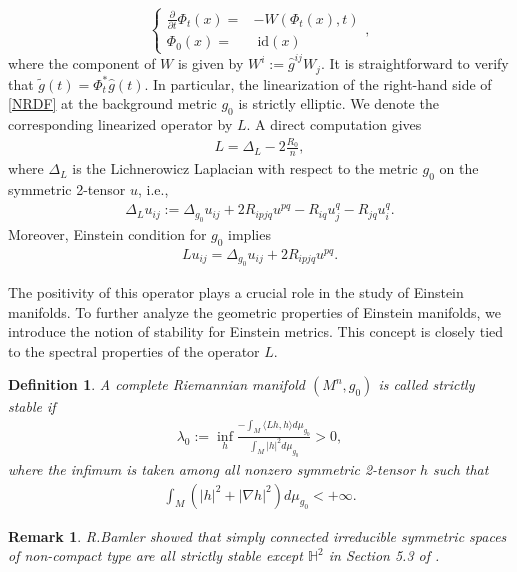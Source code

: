 \documentclass[12pt]{amsart}
\newtheorem{definition}{Definition}[section]
\newtheorem{remark}{Remark}[section]
\begin{document}
\begin{equation}\label{gauge term diffeomorphism}
    \left\{
        \begin{aligned}
            \frac{\partial}{\partial t} \Phi_t(x) =& -W(\Phi_t(x), t)\\
            \Phi_0(x) =& \; \mathrm{id}(x)
        \end{aligned}
    \right.,
\end{equation}
where the component of $W$ is given by $W^i := \hat{g}^{ij} W_j$. It is straightforward to verify that $\tilde{g}(t) = \Phi_{t}^{*}\hat{g}(t)$. In particular, the linearization of the right-hand side of \eqref{NRDF} at the background metric $g_0$ is strictly elliptic. We denote the corresponding linearized operator by $L$. A direct computation gives
\begin{align}
    L = \Delta_L - 2\frac{R_0}{n},
\end{align}
where $\Delta_L$ is the Lichnerowicz Laplacian with respect to the metric $g_0$ on the symmetric 2-tensor $u$, i.e., 
\begin{align}
    \Delta_L u_{ij} := \Delta_{g_0} u_{ij} + 2R_{ipjq} u^{pq} - R_{iq} u^{q}_j - R_{jq}u^{q}_{i}.
\end{align}
Moreover, Einstein condition for $g_0$ implies 
\begin{align}
    L u_{ij} = \Delta_{g_0} u_{ij} + 2 R_{ipjq} u^{pq}.
\end{align}

The positivity of this operator plays a crucial role in the study of Einstein manifolds. To further analyze the geometric properties of Einstein manifolds, we introduce the notion of stability for Einstein metrics. This concept is closely tied to the spectral properties of the operator $L$.
\begin{definition}\label{strictly stable}
    A complete Riemannian manifold $(M^n, g_0)$ is called strictly stable if 
    \begin{align}
        \lambda_0 :=  \inf_h \frac{\displaystyle -\int_M  \langle L h, h \rangle d\mu_{g_0}}{\displaystyle \int_M |h|^2 d\mu_{g_0}} > 0,
    \end{align}
    where the infimum is taken among all nonzero symmetric 2-tensor $h$ such that 
    \begin{align*}
        \int_{M} \left( |h|^2 + |\nabla h|^2 \right) d\mu_{g_0} < + \infty.
    \end{align*}
\end{definition}
\begin{remark}
    R.Bamler showed that simply connected irreducible symmetric spaces of non-compact type are all strictly stable except $\mathbb{H}^2$ in Section 5.3 of  \cite{Ba2015}. 
\end{remark}
\end{document}
